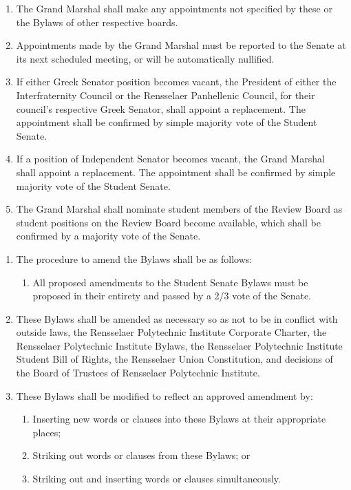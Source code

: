 
\begin{enumerate}
\item The Grand Marshal shall make any appointments not specified by these or the Bylaws of other respective boards.
\item Appointments made by the Grand Marshal must be reported to the Senate at its next scheduled meeting, or will be automatically nullified.
\item If either Greek Senator position becomes vacant, the President of either the Interfraternity Council or the Rensselaer Panhellenic Council, for their council’s respective Greek Senator, shall appoint a replacement. The appointment shall be confirmed by simple majority vote of the Student Senate.
\item If a position of Independent Senator becomes vacant, the Grand Marshal shall appoint a replacement. The appointment shall be confirmed by simple majority vote of the Student Senate.
\item The Grand Marshal shall nominate student members of the Review Board as student positions on the Review Board become available, which shall be confirmed by a majority vote of the Senate.
\end{enumerate}


\begin{enumerate}
\item The procedure to amend the Bylaws shall be as follows:
  \begin{enumerate}
  \item All proposed amendments to the Student Senate Bylaws must be proposed in their entirety and passed by a 2/3 vote of the Senate.
  \end{enumerate}
\item These Bylaws shall be amended as necessary so as not to be in conflict with outside laws, the Rensselaer Polytechnic Institute Corporate Charter, the Rensselaer Polytechnic Institute Bylaws, the Rensselaer Polytechnic Institute Student Bill of Rights, the Rensselaer Union Constitution, and decisions of the Board of Trustees of Rensselaer Polytechnic Institute.
\item These Bylaws shall be modified to reflect an approved amendment by:
  \begin{enumerate}
  \item Inserting new words or clauses into these Bylaws at their appropriate places;
  \item Striking out words or clauses from these Bylaws; or
  \item Striking out and inserting words or clauses simultaneously.
  \end{enumerate}
\end{enumerate}

